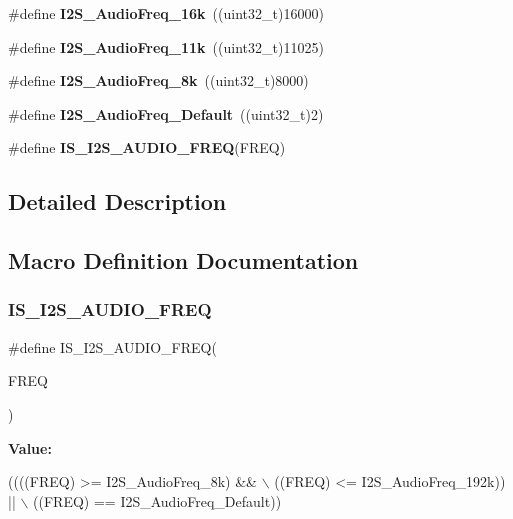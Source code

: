\begin{DoxyCompactItemize}
\#define {\bfseries I2\+S\+\_\+\+Audio\+Freq\+\_\+16k}~((uint32\+\_\+t)16000)
\item 
\mbox{\label{group___s_p_i___i2_s___audio___frequency_ga3adf95fadd1ad75670ed1babd5faca39}} 
\#define {\bfseries I2\+S\+\_\+\+Audio\+Freq\+\_\+11k}~((uint32\+\_\+t)11025)
\item 
\mbox{\label{group___s_p_i___i2_s___audio___frequency_ga7868ac234485a80d45586dd87cd00043}} 
\#define {\bfseries I2\+S\+\_\+\+Audio\+Freq\+\_\+8k}~((uint32\+\_\+t)8000)
\item 
\mbox{\label{group___s_p_i___i2_s___audio___frequency_ga30f78e8214e8a91cdb6d6360c1d3f18d}} 
\#define {\bfseries I2\+S\+\_\+\+Audio\+Freq\+\_\+\+Default}~((uint32\+\_\+t)2)
\item 
\#define {\bfseries I\+S\+\_\+\+I2\+S\+\_\+\+A\+U\+D\+I\+O\+\_\+\+F\+R\+EQ}(F\+R\+EQ)
\end{DoxyCompactItemize}


\subsection{Detailed Description}


\subsection{Macro Definition Documentation}
\mbox{\label{group___s_p_i___i2_s___audio___frequency_gaf39d917f4a38fd9916ec347fb055391c}} 
\subsubsection{\texorpdfstring{I\+S\+\_\+\+I2\+S\+\_\+\+A\+U\+D\+I\+O\+\_\+\+F\+R\+EQ}{IS\_I2S\_AUDIO\_FREQ}}
{\footnotesize\ttfamily \#define I\+S\+\_\+\+I2\+S\+\_\+\+A\+U\+D\+I\+O\+\_\+\+F\+R\+EQ(\begin{DoxyParamCaption}\item[{}]{F\+R\+EQ }\end{DoxyParamCaption})}

{\bfseries Value\+:}
\begin{DoxyCode}
((((FREQ) >= I2S\_AudioFreq\_8k) && \(\backslash\)
                                 ((FREQ) <= I2S\_AudioFreq\_192k)) || \(\backslash\)
                                 ((FREQ) == I2S\_AudioFreq\_Default))
\end{DoxyCode}
